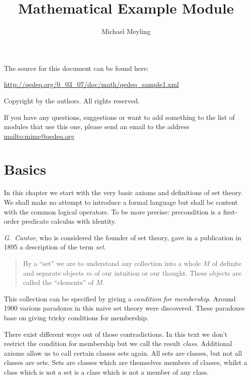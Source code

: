 \documentclass[a4paper,german,10pt,twoside]{book}
\title{Mathematical Example Module}
\author{
Michael Meyling
}
\theoremstyle{definition}
\theoremstyle{remark}
\begin{document}
\maketitle

\setlength{\parskip}{5pt plus 2pt minus 1pt}
\mbox{}
\vfill

\par
The source for this document can be found here:
\par
\url{http://qedeq.org/0_03_07/doc/math/qedeq_sample1.xml}

\par
Copyright by the authors. All rights reserved.
\par
If you have any questions, suggestions or want to add something to the list of modules that use this one, please send an email to the address \url{mailto:mime@qedeq.org}

\setlength{\parskip}{0pt}
\tableofcontents

\setlength{\parskip}{5pt plus 2pt minus 1pt}

\chapter{Basics} \label{chapter0} \hypertarget{chapter0}{}

In this chapter we start with the very basic axioms and definitions of set theory. We shall make no attempt to introduce a formal language but shall be content with the common logical operators. To be more precise: precondition is a first-order predicate calculus with identity.

\par
\emph{G.~Cantor}, who is considered the founder of set theory, gave in a publication in 1895 a description of the term \emph{set}.

\begin{quote}
 By a ``set'' we are to understand any collection into a whole $M$ of definite and separate objects $m$ of our intuition or our thought. These objects are called the ``elements'' of $M$.
\end{quote}

\par
This collection can be specified by giving a \emph{condition for membership}. Around 1900 various paradoxes in this naive set theory were discovered. These paradoxes base on giving tricky conditions for membership.

\par
There exist different ways out of those contradictions. In this text we don't restrict the condition for membership but we call the result \emph{class}. Additional axioms allow us to call certain classes sets again. All sets are classes, but not all classes are sets. Sets are classes which are themselves members of classes, whilst a class which is not a set is a class which is not a member of any class.
\end{document}
